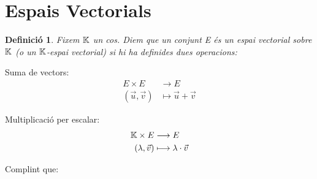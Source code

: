 \documentclass[a4paper, 11pt]{article}
\newtheorem*{definicio}{Definició}
\begin{document}
\section{Espais Vectorials}
\begin{definicio}
	Fixem $\mathbb{K}$ un cos. Diem que un conjunt E és un espai vectorial sobre $\mathbb{K}$ (o un $\mathbb{K}$-espai vectorial) si hi ha definides dues operacions:
\end{definicio}
\begin{multicols}{2}
	Suma de vectors:
	\begin{align*}
		E \times E & \longrightarrow E \\
		(\vec{u}, \vec{v}) & \longmapsto \vec{u} + \vec{v}
	\end{align*}

\columnbreak

	Multiplicació per escalar:
	\begin{align*}
		\mathbb{K} \times E & \longrightarrow E \\
		(\lambda, \vec{v}) & \longmapsto \lambda \cdot \vec{v}
	\end{align*}
\end{multicols}
Complint que:
\end{document}
